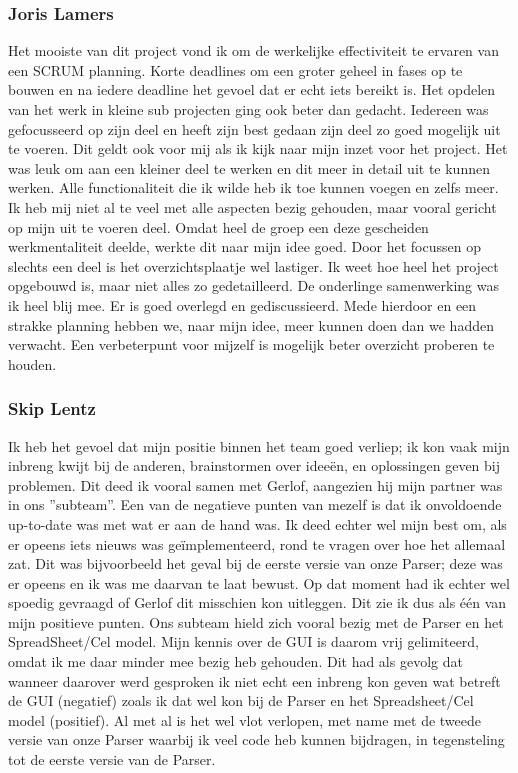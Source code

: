 \documentclass[a4paper,11pt,titlepage]{scrartcl}
\begin{document}
\subsubsection{Joris Lamers}
Het mooiste van dit project vond ik om de werkelijke effectiviteit te ervaren van een SCRUM planning. Korte deadlines om een groter geheel in fases op te bouwen en na iedere deadline het gevoel dat er echt iets bereikt is. Het opdelen van het werk in kleine sub projecten ging ook beter dan gedacht. Iedereen was gefocusseerd op zijn deel en heeft zijn best gedaan zijn deel zo goed mogelijk uit te voeren. Dit geldt ook voor mij als ik kijk naar mijn inzet voor het project. Het was leuk om aan een kleiner deel te werken en dit meer in detail uit te kunnen werken. Alle functionaliteit die ik wilde heb ik toe kunnen voegen en zelfs meer. Ik heb mij niet al te veel met alle aspecten bezig gehouden, maar vooral gericht op mijn uit te voeren deel. Omdat heel de groep een deze gescheiden werkmentaliteit deelde, werkte dit naar mijn idee goed. Door het focussen op slechts een deel is het overzichtsplaatje wel lastiger. Ik weet hoe heel het project opgebouwd is, maar niet alles zo gedetailleerd. De onderlinge samenwerking was ik heel blij mee. Er is goed overlegd en gediscussieerd. Mede hierdoor en een strakke planning hebben we, naar mijn idee, meer kunnen doen dan we hadden verwacht. Een verbeterpunt voor mijzelf is mogelijk beter overzicht proberen te houden.
\newpage\subsubsection{Skip Lentz}
Ik heb het gevoel dat mijn positie binnen het team goed verliep; ik kon vaak mijn inbreng kwijt bij de anderen, brainstormen over idee\"{e}n, en oplossingen geven bij problemen. Dit deed ik vooral samen met Gerlof, aangezien hij mijn partner was in ons ''subteam''.
Een van de negatieve punten van mezelf is dat ik onvoldoende up-to-date was met wat er aan de hand was. Ik deed echter wel mijn best om, als er opeens iets nieuws was ge\"{i}mplementeerd, rond te vragen over hoe het allemaal zat. Dit was bijvoorbeeld het geval bij de eerste versie van onze Parser; deze was er opeens en ik was me daarvan te laat bewust. Op dat moment had ik echter wel spoedig gevraagd of Gerlof dit misschien kon uitleggen. Dit zie ik dus als \'{e}\'{e}n van mijn positieve punten.
Ons subteam hield zich vooral bezig met de Parser en het SpreadSheet/Cel model. Mijn kennis over de GUI is daarom vrij gelimiteerd, omdat ik me daar minder mee bezig heb gehouden. Dit had als gevolg dat wanneer daarover werd gesproken ik niet echt een inbreng kon geven wat betreft de GUI (negatief) zoals ik dat wel kon bij de Parser en het Spreadsheet/Cel model (positief).
Al met al is het wel vlot verlopen, met name met de tweede versie van onze Parser waarbij ik veel code heb kunnen bijdragen, in tegensteling tot de eerste versie van de Parser.
\end{document}
